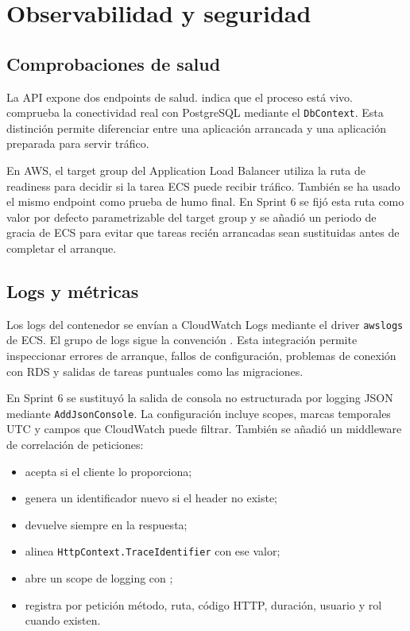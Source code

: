 \chapter{Observabilidad y seguridad}
\label{chap:observabilidad-seguridad}

\section{Comprobaciones de salud}
\label{sec:health-checks}

La API expone dos endpoints de salud.  indica que el proceso está vivo.  comprueba la conectividad real con PostgreSQL mediante el \texttt{DbContext}. Esta distinción permite diferenciar entre una aplicación arrancada y una aplicación preparada para servir tráfico.

En AWS, el target group del Application Load Balancer utiliza la ruta de readiness para decidir si la tarea ECS puede recibir tráfico. También se ha usado el mismo endpoint como prueba de humo final. En Sprint 6 se fijó esta ruta como valor por defecto parametrizable del target group y se añadió un periodo de gracia de ECS para evitar que tareas recién arrancadas sean sustituidas antes de completar el arranque.

\section{Logs y métricas}
\label{sec:logs-metricas}

Los logs del contenedor se envían a CloudWatch Logs mediante el driver \texttt{awslogs} de ECS. El grupo de logs sigue la convención . Esta integración permite inspeccionar errores de arranque, fallos de configuración, problemas de conexión con RDS y salidas de tareas puntuales como las migraciones.

En Sprint 6 se sustituyó la salida de consola no estructurada por logging JSON mediante \texttt{AddJsonConsole}. La configuración incluye scopes, marcas temporales UTC y campos que CloudWatch puede filtrar. También se añadió un middleware de correlación de peticiones:

\begin{itemize}
  \item acepta  si el cliente lo proporciona;
  \item genera un identificador nuevo si el header no existe;
  \item devuelve siempre  en la respuesta;
  \item alinea \texttt{HttpContext.TraceIdentifier} con ese valor;
  \item abre un scope de logging con ;
  \item registra por petición método, ruta, código HTTP, duración, usuario y rol cuando existen.
\end{itemize}

